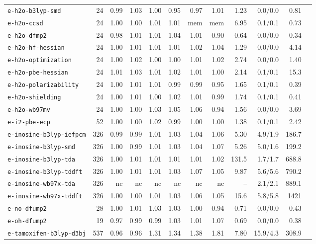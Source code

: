 \begin{longtable}{lrrrrrrrrrrr}
\texttt{e-h2o-b3lyp-smd} & 24 & 0.99 & 1.03 & 1.00 & 0.95 & 0.97 & 1.01 & 1.23 & 0.0/0.0 & 0.81 \\
\texttt{e-h2o-ccsd} & 24 & 1.00 & 1.00 & 1.01 & 1.01 & mem & mem & 6.95 & 0.1/0.1 & 0.73 \\
\texttt{e-h2o-dfmp2} & 24 & 0.98 & 1.01 & 1.01 & 1.04 & 1.01 & 0.90 & 0.64 & 0.0/0.0 & 0.34 \\
\texttt{e-h2o-hf-hessian} & 24 & 1.00 & 1.01 & 1.01 & 1.01 & 1.02 & 1.04 & 1.29 & 0.0/0.0 & 4.14 \\
\texttt{e-h2o-optimization} & 24 & 1.00 & 1.02 & 1.00 & 1.00 & 1.01 & 1.02 & 2.74 & 0.0/0.0 & 1.40 \\
\texttt{e-h2o-pbe-hessian} & 24 & 1.01 & 1.03 & 1.01 & 1.02 & 1.01 & 1.00 & 2.14 & 0.1/0.1 & 15.3 \\
\texttt{e-h2o-polarizability} & 24 & 1.00 & 1.01 & 1.01 & 0.99 & 0.99 & 0.95 & 1.65 & 0.1/0.1 & 0.39 \\
\texttt{e-h2o-shielding} & 24 & 1.00 & 1.01 & 1.00 & 1.02 & 1.01 & 0.99 & 1.74 & 0.1/0.1 & 0.41 \\
\texttt{e-h2o-wb97mv} & 24 & 1.00 & 1.00 & 1.03 & 1.05 & 1.06 & 0.94 & 1.56 & 0.0/0.0 & 3.69 \\
\texttt{e-i2-pbe-ecp} & 52 & 1.00 & 1.00 & 1.02 & 0.99 & 1.00 & 1.00 & 1.38 & 0.1/0.1 & 2.42 \\
\texttt{e-inosine-b3lyp-iefpcm} & 326 & 0.99 & 0.99 & 1.01 & 1.03 & 1.04 & 1.06 & 5.30 & 4.9/1.9 & 186.7 \\
\texttt{e-inosine-b3lyp-smd} & 326 & 1.00 & 0.99 & 1.01 & 1.03 & 1.04 & 1.07 & 5.26 & 5.0/1.6 & 199.2 \\
\texttt{e-inosine-b3lyp-tda} & 326 & 1.00 & 1.01 & 1.01 & 1.01 & 1.01 & 1.02 & 131.5 & 1.7/1.7 & 688.8 \\
\texttt{e-inosine-b3lyp-tddft} & 326 & 1.00 & 1.01 & 1.01 & 1.03 & 1.07 & 1.05 & 9.87 & 5.6/5.6 & 790.2 \\
\texttt{e-inosine-wb97x-tda} & 326 & nc & nc & nc & nc & nc & nc & -- & 2.1/2.1 & 889.1 \\
\texttt{e-inosine-wb97x-tddft} & 326 & 1.00 & 1.00 & 1.01 & 1.03 & 1.06 & 1.05 & 15.6 & 5.8/5.8 & 1421 \\
\texttt{e-no-dfump2} & 28 & 1.00 & 1.01 & 1.03 & 1.03 & 1.00 & 0.94 & 0.71 & 0.0/0.0 & 0.43 \\
\texttt{e-oh-dfump2} & 19 & 0.97 & 0.99 & 0.99 & 1.03 & 1.01 & 1.07 & 0.69 & 0.0/0.0 & 0.38 \\
\texttt{e-tamoxifen-b3lyp-d3bj} & 537 & 0.96 & 0.96 & 1.31 & 1.34 & 1.38 & 1.81 & 7.80 & 15.9/4.3 & 308.9 \\

\end{longtable}
